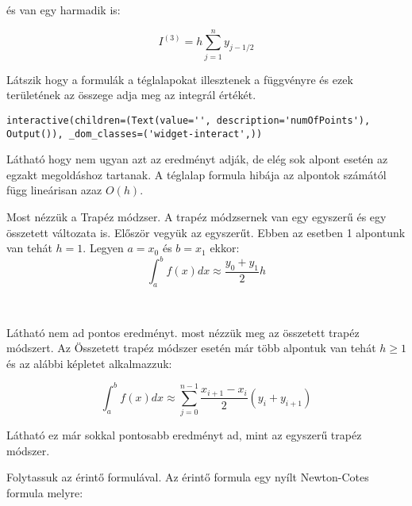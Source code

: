 és van egy harmadik is:

\[
I^{(3)}= h  \sum^{n}_{j=1}y_{j-1/2}
\]

Látszik hogy a formulák a téglalapokat illesztenek a függvényre és ezek
területének az összege adja meg az integrál értékét.

\begin{python}

\end{python}

    
    \begin{verbatim}
interactive(children=(Text(value='', description='numOfPoints'), Output()), _dom_classes=('widget-interact',))
    \end{verbatim}

    
    Látható hogy nem ugyan azt az eredményt adják, de elég sok alpont esetén
az egzakt megoldáshoz tartanak. A téglalap formula hibája az alpontok
számától függ lineárisan azaz \(O(h)\).

    Most nézzük a Trapéz módzser. A trapéz módzsernek van egy egyszerű és
egy összetett változata is. Először vegyük az egyszerűt. Ebben az
esetben 1 alpontunk van tehát \(h=1\). Legyen \(a=x_0\) és \(b=x_1\)
ekkor: \[
\int^b_a f(x)dx \approx \frac{y_0+y_1}{2}h
\]

\begin{python}

\end{python}


    \begin{center}
    \end{center}
    { \hspace*{\fill} \\}
    
    Látható nem ad pontos eredményt. most nézzük meg az összetett trapéz
módszert. Az Összetett trapéz módszer esetén már több alpontuk van tehát
\(h\geq 1\) és az alábbi képletet alkalmazzuk:

\[
\int^b_a f(x)dx \approx \sum^{n-1}_{j=0}\frac{x_{i+1}-x_i}{2}(y_i+y_{i+1})
\]

   \begin{python}

\end{python}

    Látható ez már sokkal pontosabb eredményt ad, mint az egyszerű trapéz
módszer.

    Folytassuk az érintő formulával. Az érintő formula egy nyílt
Newton-Cotes formula melyre:

